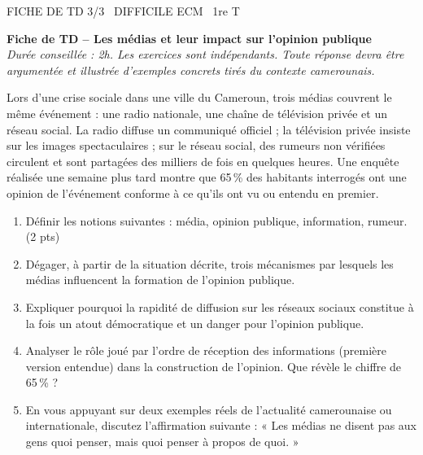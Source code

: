 \documentclass[11pt]{article}
\begin{document}
\begin{tcolorbox}[enhanced,colback=popink,colframe=popink,arc=10pt,boxrule=0pt,left=12pt,right=12pt,top=9pt,bottom=9pt]
{\color{white}\popxbold\small FICHE DE TD 3/3 \textbullet\ DIFFICILE \hfill ECM \textbullet\ 1re T\par}
\end{tcolorbox}
\vspace{4pt}
\textbf{Fiche de TD -- Les médias et leur impact sur l'opinion publique}\\
\textit{Durée conseillée : 2h. Les exercices sont indépendants. Toute réponse devra être argumentée et illustrée d'exemples concrets tirés du contexte camerounais.}

\begin{exercice}
Lors d'une crise sociale dans une ville du Cameroun, trois médias couvrent le même événement : une radio nationale, une chaîne de télévision privée et un réseau social. La radio diffuse un communiqué officiel ; la télévision privée insiste sur les images spectaculaires ; sur le réseau social, des rumeurs non vérifiées circulent et sont partagées des milliers de fois en quelques heures. Une enquête réalisée une semaine plus tard montre que 65\,\% des habitants interrogés ont une opinion de l'événement conforme à ce qu'ils ont vu ou entendu en premier.
\begin{enumerate}
\item Définir les notions suivantes : média, opinion publique, information, rumeur. (2 pts)
\item Dégager, à partir de la situation décrite, trois mécanismes par lesquels les médias influencent la formation de l'opinion publique.
\item Expliquer pourquoi la rapidité de diffusion sur les réseaux sociaux constitue à la fois un atout démocratique et un danger pour l'opinion publique.
\item Analyser le rôle joué par l'ordre de réception des informations (première version entendue) dans la construction de l'opinion. Que révèle le chiffre de 65\,\% ?
\item En vous appuyant sur deux exemples réels de l'actualité camerounaise ou internationale, discutez l'affirmation suivante : « Les médias ne disent pas aux gens quoi penser, mais quoi penser à propos de quoi. »
\end{enumerate}
\end{exercice}
\end{document}
